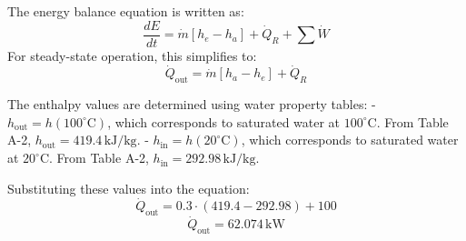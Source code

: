 The energy balance equation is written as:  
\[
\frac{dE}{dt} = \dot{m} \left[ h_e - h_a \right] + \dot{Q}_R + \sum \dot{W}
\]  
For steady-state operation, this simplifies to:  
\[
\dot{Q}_{\text{out}} = \dot{m} \left[ h_a - h_e \right] + \dot{Q}_R
\]  

The enthalpy values are determined using water property tables:  
- \( h_{\text{out}} = h(100^\circ\text{C}) \), which corresponds to saturated water at \( 100^\circ\text{C} \). From Table A-2, \( h_{\text{out}} = 419.4 \, \text{kJ/kg} \).  
- \( h_{\text{in}} = h(20^\circ\text{C}) \), which corresponds to saturated water at \( 20^\circ\text{C} \). From Table A-2, \( h_{\text{in}} = 292.98 \, \text{kJ/kg} \).  

Substituting these values into the equation:  
\[
\dot{Q}_{\text{out}} = 0.3 \cdot \left( 419.4 - 292.98 \right) + 100
\]  
\[
\dot{Q}_{\text{out}} = 62.074 \, \text{kW}
\]